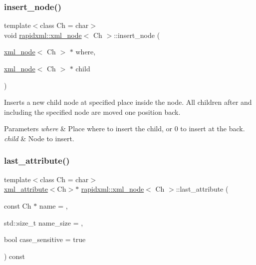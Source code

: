 \subsubsection{\texorpdfstring{insert\+\_\+node()}{insert\_node()}}
{\footnotesize\ttfamily template$<$class Ch = char$>$ \\
void \mbox{\hyperlink{classrapidxml_1_1xml__node}{rapidxml\+::xml\+\_\+node}}$<$ Ch $>$\+::insert\+\_\+node (\begin{DoxyParamCaption}\item[{\mbox{\hyperlink{classrapidxml_1_1xml__node}{xml\+\_\+node}}$<$ Ch $>$ $\ast$}]{where,  }\item[{\mbox{\hyperlink{classrapidxml_1_1xml__node}{xml\+\_\+node}}$<$ Ch $>$ $\ast$}]{child }\end{DoxyParamCaption})\hspace{0.3cm}{\ttfamily [inline]}}

Inserts a new child node at specified place inside the node. All children after and including the specified node are moved one position back. 
\begin{DoxyParams}{Parameters}
{\em where} & Place where to insert the child, or 0 to insert at the back. \\
\hline
{\em child} & Node to insert. \\
\hline
\end{DoxyParams}
\mbox{\label{classrapidxml_1_1xml__node_a67db03d1568dc6891573210ddba61520}} 
\subsubsection{\texorpdfstring{last\+\_\+attribute()}{last\_attribute()}}
{\footnotesize\ttfamily template$<$class Ch = char$>$ \\
\mbox{\hyperlink{classrapidxml_1_1xml__attribute}{xml\+\_\+attribute}}$<$Ch$>$$\ast$ \mbox{\hyperlink{classrapidxml_1_1xml__node}{rapidxml\+::xml\+\_\+node}}$<$ Ch $>$\+::last\+\_\+attribute (\begin{DoxyParamCaption}\item[{const Ch $\ast$}]{name = {},  }\item[{std\+::size\+\_\+t}]{name\+\_\+size = {},  }\item[{bool}]{case\+\_\+sensitive = {\ttfamily true} }\end{DoxyParamCaption}) const\hspace{0.3cm}{\ttfamily [inline]}}

